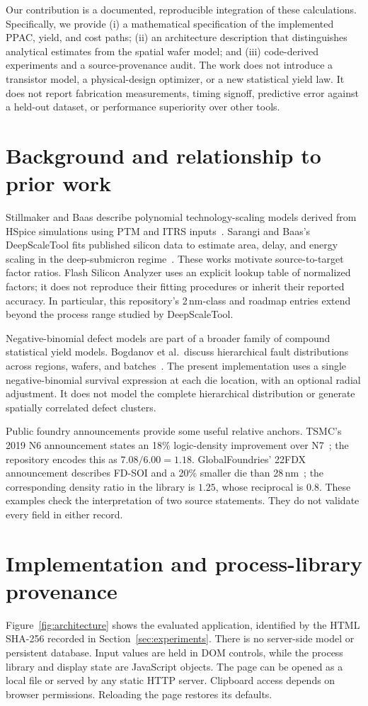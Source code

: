 \documentclass[11pt,a4paper]{article}
\newcommand{\tool}{Flash Silicon Analyzer}
\begin{document}
Our contribution is a documented, reproducible integration of these
calculations. Specifically, we provide (i) a mathematical specification of
the implemented PPAC, yield, and cost paths; (ii) an architecture description
that distinguishes analytical estimates from the spatial wafer model; and
(iii) code-derived experiments and a source-provenance audit. The work does
not introduce a transistor model, a physical-design optimizer, or a new
statistical yield law. It does not report fabrication measurements, timing
signoff, predictive error against a held-out dataset, or performance
superiority over other tools.

\section{Background and relationship to prior work}
Stillmaker and Baas describe polynomial technology-scaling models derived from
HSpice simulations using PTM and ITRS inputs~\cite{stillmaker2017}.
Sarangi and Baas's DeepScaleTool fits published silicon data to estimate
area, delay, and energy scaling in the deep-submicron
regime~\cite{deepscale2021}. These works motivate source-to-target factor
ratios. \tool{} uses an explicit lookup table of normalized factors;
it does not reproduce their fitting procedures or inherit their reported
accuracy. In particular, this repository's 2\,nm-class and roadmap entries
extend beyond the process range studied by DeepScaleTool.

Negative-binomial defect models are part of a broader family of compound
statistical yield models. Bogdanov et al.\ discuss hierarchical fault
distributions across regions, wafers, and batches~\cite{yield2003}. The
present implementation uses a single negative-binomial survival expression
at each die location, with an optional radial adjustment. It does not model
the complete hierarchical distribution or generate spatially correlated
defect clusters.

Public foundry announcements provide some useful relative anchors. TSMC's
2019 N6 announcement states an 18\% logic-density improvement over
N7~\cite{tsmc2019}; the repository encodes this as $7.08/6.00=1.18$.
GlobalFoundries' 22FDX announcement describes FD-SOI and a 20\% smaller die
than 28\,nm~\cite{gf2015}; the corresponding density ratio in the library is
$1.25$, whose reciprocal is $0.8$. These examples check the interpretation of
two source statements. They do not validate every field in either record.

\section{Implementation and process-library provenance}
\label{sec:architecture}
Figure~\ref{fig:architecture} shows the evaluated application, identified by
the HTML SHA-256 recorded in Section~\ref{sec:experiments}. There is no
server-side model or persistent database. Input values are held in DOM
controls, while the process library and display state are JavaScript objects.
The page can be opened as a local file or served by any static HTTP server.
Clipboard access depends on browser permissions. Reloading the page restores
its defaults.
\end{document}
